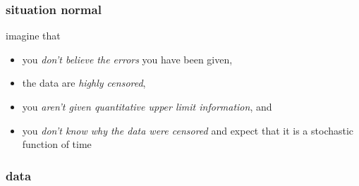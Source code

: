 \documentclass[pdftex]{beamer}
\begin{document}
\begin{frame}
  \frametitle{situation normal}
  imagine that
  \begin{itemize}
  \item you \emph{don't believe the errors} you have been given,
  \item the data are \emph{highly censored},
  \item you \emph{aren't given quantitative upper limit information}, and
  \item you \emph{don't know why the data were censored} and expect that it is a stochastic function of time
  \end{itemize}
\end{frame}

\begin{frame}
  \frametitle{ data}

\end{frame}
\end{document}
